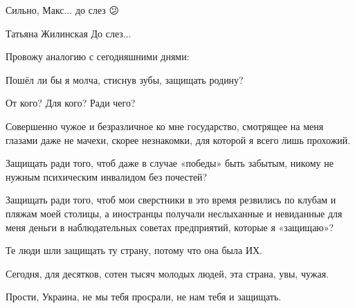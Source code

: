 \begin{itemize}

Сильно, Макс... до слез 😕

Татьяна Жилинская
До слез...


Провожу аналогию с сегодняшними днями:

Пошёл ли бы я молча, стиснув зубы, защищать родину?

От кого? Для кого? Ради чего?

Совершенно чужое и безразличное ко мне государство, смотрящее на меня глазами
даже не мачехи, скорее незнакомки, для которой я всего лишь прохожий.

Защищать ради того, чтоб даже в случае «победы» быть забытым, никому не нужным
психическим инвалидом без почестей?

Защищать ради того, чтоб мои сверстники в это время резвились по клубам и
пляжам моей столицы, а иностранцы получали неслыханные и невиданные для меня
деньги в наблюдательных советах предприятий, которые я «защищаю»?

Те люди шли защищать ту страну, потому что она была ИХ.

Сегодня, для десятков, сотен тысяч молодых людей, эта страна, увы, чужая.

Прости, Украина, не мы тебя просрали, не нам тебя и защищать.


\end{itemize}
